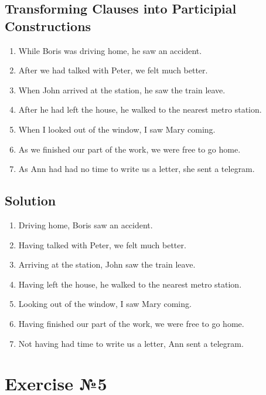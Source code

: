 \subsection*{Transforming Clauses into Participial Constructions}
\begin{enumerate}
      \item While Boris was driving home, he saw an accident.
      \item After we had talked with Peter, we felt much better.
      \item When John arrived at the station, he saw the train leave.
      \item After he had left the house, he walked to the nearest metro station.
      \item When I looked out of the window, I saw Mary coming.
      \item As we finished our part of the work, we were free to go home.
      \item As Ann had had no time to write us a letter, she sent a telegram.
\end{enumerate}

\subsection*{Solution}
\begin{enumerate}
      \item Driving home, Boris saw an accident.
      \item Having talked with Peter, we felt much better.
      \item Arriving at the station, John saw the train leave.
      \item Having left the house, he walked to the nearest metro station.
      \item Looking out of the window, I saw Mary coming.
      \item Having finished our part of the work, we were free to go home.
      \item Not having had time to write us a letter, Ann sent a telegram.
\end{enumerate}

\section{Exercise №5}

